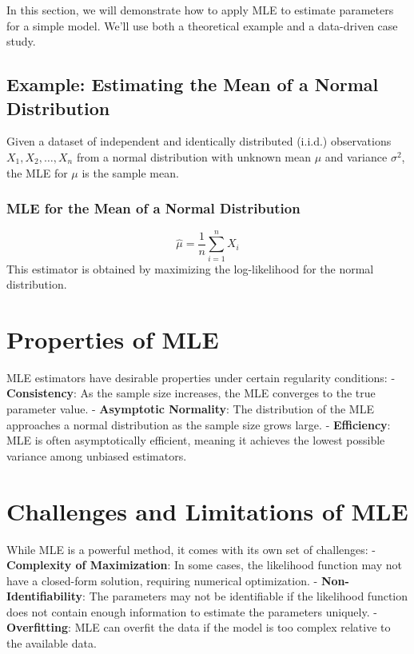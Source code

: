 \documentclass[
  12 pt,
  a4paper,
]{book}
\numberwithin{equation}{section}
\theoremstyle{plain}      %
\theoremstyle{definition} %
\theoremstyle{remark}     %
\theoremstyle{note}         %
\begin{document}
In this section, we will demonstrate how to apply MLE to estimate
parameters for a simple model. We'll use both a theoretical example and
a data-driven case study.

\hypertarget{example-estimating-the-mean-of-a-normal-distribution}{%
\subsection{Example: Estimating the Mean of a Normal
Distribution}\label{example-estimating-the-mean-of-a-normal-distribution}}

Given a dataset of independent and identically distributed (i.i.d.)
observations \(X_1, X_2, \dots, X_n\) from a normal distribution with
unknown mean \(\mu\) and variance \(\sigma^2\), the MLE for \(\mu\) is
the sample mean.

\hypertarget{mle-for-the-mean-of-a-normal-distribution}{%
\subsubsection{MLE for the Mean of a Normal
Distribution}\label{mle-for-the-mean-of-a-normal-distribution}}

\[
\hat{\mu} = \frac{1}{n} \sum_{i=1}^{n} X_i
\] This estimator is obtained by maximizing the log-likelihood for the
normal distribution.

\newpage

\hypertarget{properties-of-mle}{%
\section{Properties of MLE}\label{properties-of-mle}}

MLE estimators have desirable properties under certain regularity
conditions: - \textbf{Consistency}: As the sample size increases, the
MLE converges to the true parameter value. - \textbf{Asymptotic
Normality}: The distribution of the MLE approaches a normal distribution
as the sample size grows large. - \textbf{Efficiency}: MLE is often
asymptotically efficient, meaning it achieves the lowest possible
variance among unbiased estimators.

\hypertarget{challenges-and-limitations-of-mle}{%
\section{Challenges and Limitations of
MLE}\label{challenges-and-limitations-of-mle}}

While MLE is a powerful method, it comes with its own set of challenges:
- \textbf{Complexity of Maximization}: In some cases, the likelihood
function may not have a closed-form solution, requiring numerical
optimization. - \textbf{Non-Identifiability}: The parameters may not be
identifiable if the likelihood function does not contain enough
information to estimate the parameters uniquely. - \textbf{Overfitting}:
MLE can overfit the data if the model is too complex relative to the
available data.
\end{document}
